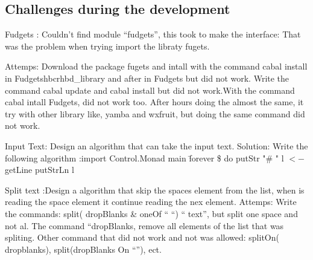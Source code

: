 \documentclass{aes2e}
\begin{document}
\subsection{Challenges during the development}
\begin{paralist}
\item{}Fudgets : Couldn't find module “fudgets”, this  took to make the interface: That was the problem  when trying import the libraty fugets. \newline\newline

Attemps: Download the package fugets and intall with the command cabal install in Fudgets\/hbcr\/hbd\_library and after in Fudgets\/ but did not work.\newline
Write the command cabal update and cabal install but did not work.With the command cabal intall Fudgets, did not work too.\newline
After hours doing the almost the same, it try with other library like, yamba and wxfruit, but doing the same command did not work.
\newline\newline
\item{}Input Text: Design an algorithm that can take the input text.\newline\newline
Solution:   Write the following algorithm :\newline import Control.Monad  \newline     main \= forever \$ do  \newline
putStr "\# " \newline    l $<-$ getLine  \newline   putStrLn  l  \newline\newline 

\item{}Split text :Design a  algorithm that skip the spaces element from the list, when is reading the space element it continue reading the nex element. \newline\newline
Attemps: Write the commands: \newline split( dropBlanks \& oneOf “ “) “ text”, but split one space and not al. \newline The command “dropBlanks, remove all elements of the list that was spliting.\newline
Other command that did not work and not was allowed: splitOn( dropblanks), split(dropBlanks On “”), ect.\newline


\end{paralist}
\end{document}
